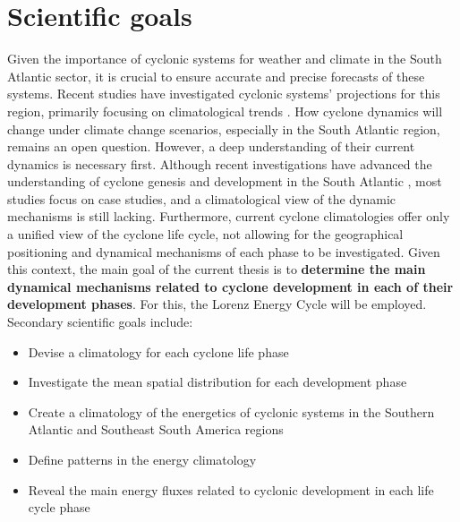 \section{Scientific goals}

Given the importance of cyclonic systems for weather and climate in the South Atlantic sector, it is crucial to ensure accurate and precise forecasts of these systems. Recent studies have investigated cyclonic systems' projections for this region, primarily focusing on climatological trends \citep[e.g.]{reboita2018extratropical,de2022future}. How cyclone dynamics will change under climate change scenarios, especially in the South Atlantic region, remains an open question. However, a deep understanding of their current dynamics is necessary first. Although recent investigations have advanced the understanding of cyclone genesis and development in the South Atlantic \citep[e.g.]{dias2011energy,dias2013synoptic,gozzo2014subtropical,reboita2018key,gramcianinov2019properties}, most studies focus on case studies, and a climatological view of the dynamic mechanisms is still lacking. Furthermore, current cyclone climatologies offer only a unified view of the cyclone life cycle, not allowing for the geographical positioning and dynamical mechanisms of each phase to be investigated. Given this context, the main goal of the current thesis is to \textbf{determine the main dynamical mechanisms related to cyclone development in each of their development phases}. For this, the Lorenz Energy Cycle will be employed. Secondary scientific goals include:

\begin{itemize}
    \item Devise a climatology for each cyclone life phase
    \item Investigate the mean spatial distribution for each development phase
    \item Create a climatology of the energetics of cyclonic systems in the Southern Atlantic and Southeast South America regions
    \item Define patterns in the energy climatology
    \item Reveal the main energy fluxes related to cyclonic development in each life cycle phase
\end{itemize}